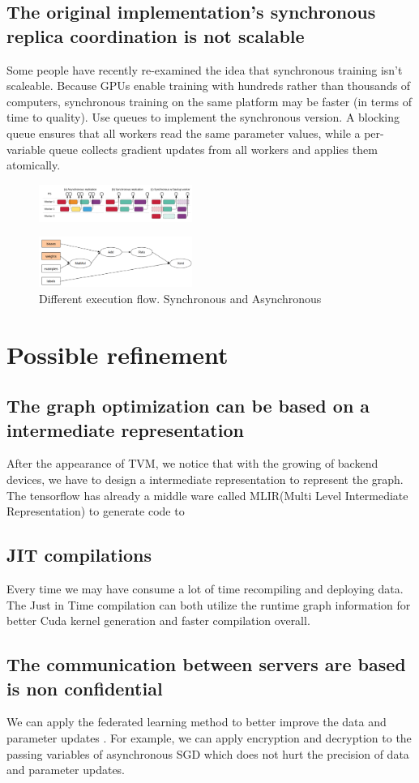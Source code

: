 \documentclass[acmlarge]{acmart}
\begin{document}
\subsection{The original implementation's synchronous replica coordination is not scalable}
Some people have recently re-examined the idea that synchronous training isn't scaleable. Because GPUs enable training with hundreds rather than thousands of computers, synchronous training on the same platform may be faster (in terms of time to quality). Use queues to implement the synchronous version. A blocking queue ensures that all workers read the same parameter values, while a per-variable queue collects gradient updates from all workers and applies them atomically.
\begin{figure}[htbp]
  \centering
  \includegraphics[width=5cm]{./replica.png}
\end{figure}
\begin{figure}[htbp]
  \centering
  \includegraphics[width=5cm]{./tensor.png}
  \caption{Different execution flow.  Synchronous and Asynchronous}
\end{figure}
\section{Possible refinement}
\subsection{The graph optimization can be based on a intermediate representation}
After the appearance of TVM\cite{chen2018tvm}, we notice that with the growing of backend devices, we have to design a intermediate representation to represent the graph. The tensorflow has already a middle ware called MLIR(Multi Level Intermediate Representation) to generate code to
\subsection{JIT compilations }
Every time we may have consume a lot of time recompiling and deploying data. The Just in Time compilation can both utilize the runtime graph information for better Cuda kernel generation and faster compilation overall.
\subsection{The communication between servers are based is non confidential}
We can apply the federated learning method to better improve the data and parameter updates \cite{federated}. For example, we can apply encryption and decryption to the passing variables of asynchronous SGD which does not hurt the precision of data and parameter updates.


\end{document}
